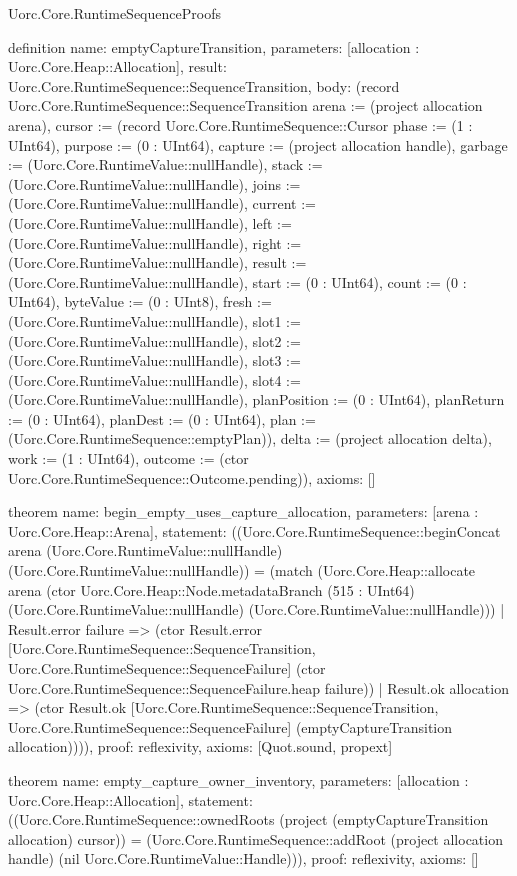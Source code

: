 \begin{lexlean}{Uorc.Core.RuntimeSequenceProofs}
\begin{semanticmodule}
definition{
  name: emptyCaptureTransition,
  parameters: [allocation : Uorc.Core.Heap::Allocation],
  result: Uorc.Core.RuntimeSequence::SequenceTransition,
  body: (record Uorc.Core.RuntimeSequence::SequenceTransition {arena := (project allocation arena), cursor := (record Uorc.Core.RuntimeSequence::Cursor {phase := (1 : UInt64), purpose := (0 : UInt64), capture := (project allocation handle), garbage := (Uorc.Core.RuntimeValue::nullHandle), stack := (Uorc.Core.RuntimeValue::nullHandle), joins := (Uorc.Core.RuntimeValue::nullHandle), current := (Uorc.Core.RuntimeValue::nullHandle), left := (Uorc.Core.RuntimeValue::nullHandle), right := (Uorc.Core.RuntimeValue::nullHandle), result := (Uorc.Core.RuntimeValue::nullHandle), start := (0 : UInt64), count := (0 : UInt64), byteValue := (0 : UInt8), fresh := (Uorc.Core.RuntimeValue::nullHandle), slot1 := (Uorc.Core.RuntimeValue::nullHandle), slot2 := (Uorc.Core.RuntimeValue::nullHandle), slot3 := (Uorc.Core.RuntimeValue::nullHandle), slot4 := (Uorc.Core.RuntimeValue::nullHandle), planPosition := (0 : UInt64), planReturn := (0 : UInt64), planDest := (0 : UInt64), plan := (Uorc.Core.RuntimeSequence::emptyPlan)}), delta := (project allocation delta), work := (1 : UInt64), outcome := (ctor Uorc.Core.RuntimeSequence::Outcome.pending)}),
  axioms: []
}

theorem{
  name: begin_empty_uses_capture_allocation,
  parameters: [arena : Uorc.Core.Heap::Arena],
  statement: ((Uorc.Core.RuntimeSequence::beginConcat arena (Uorc.Core.RuntimeValue::nullHandle) (Uorc.Core.RuntimeValue::nullHandle)) = (match (Uorc.Core.Heap::allocate arena (ctor Uorc.Core.Heap::Node.metadataBranch (515 : UInt64) (Uorc.Core.RuntimeValue::nullHandle) (Uorc.Core.RuntimeValue::nullHandle)))
    | Result.error failure => (ctor Result.error [Uorc.Core.RuntimeSequence::SequenceTransition, Uorc.Core.RuntimeSequence::SequenceFailure] (ctor Uorc.Core.RuntimeSequence::SequenceFailure.heap failure))
    | Result.ok allocation => (ctor Result.ok [Uorc.Core.RuntimeSequence::SequenceTransition, Uorc.Core.RuntimeSequence::SequenceFailure] (emptyCaptureTransition allocation)))),
  proof: reflexivity{},
  axioms: [Quot.sound, propext]
}

theorem{
  name: empty_capture_owner_inventory,
  parameters: [allocation : Uorc.Core.Heap::Allocation],
  statement: ((Uorc.Core.RuntimeSequence::ownedRoots (project (emptyCaptureTransition allocation) cursor)) = (Uorc.Core.RuntimeSequence::addRoot (project allocation handle) (nil Uorc.Core.RuntimeValue::Handle))),
  proof: reflexivity{},
  axioms: []
}
\end{semanticmodule}
\end{lexlean}
